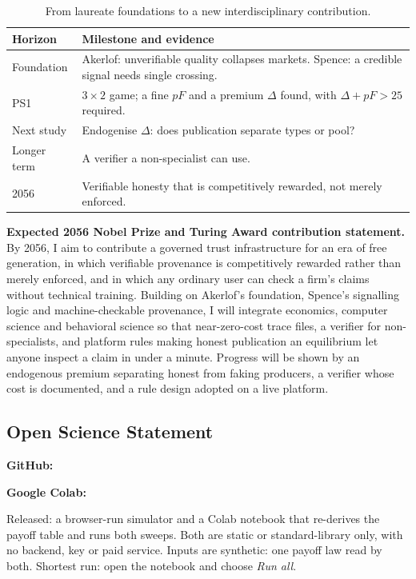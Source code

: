 \begin{table}[h]\caption{From laureate foundations to a new interdisciplinary contribution.}
\begin{tabularx}{\columnwidth}{@{}p{1.4cm}Y@{}}\toprule
\textbf{Horizon}&\textbf{Milestone and evidence}\\\midrule
Foundation&Akerlof: unverifiable quality collapses markets. Spence: a credible signal needs single crossing.\\
PS1&$3\times2$ game; a fine $pF$ and a premium $\Delta$ found, with $\Delta+pF>25$ required.\\
Next study&Endogenise $\Delta$: does publication separate types or pool?\\
Longer term&A verifier a non-specialist can use.\\
2056&Verifiable honesty that is competitively rewarded, not merely enforced.\\\bottomrule
\end{tabularx}\end{table}

\noindent\textbf{Expected 2056 Nobel Prize and Turing Award contribution statement.}
By 2056, I aim to contribute a governed trust infrastructure for an era of free generation, in which verifiable provenance is competitively rewarded rather than merely enforced, and in which any ordinary user can check a firm's claims without technical training. Building on Akerlof's foundation, Spence's signalling logic and machine-checkable provenance, I will integrate economics, computer science and behavioral science so that near-zero-cost trace files, a verifier for non-specialists, and platform rules making honest publication an equilibrium let anyone inspect a claim in under a minute. Progress will be shown by an endogenous premium separating honest from faking producers, a verifier whose cost is documented, and a rule design adopted on a live platform.

\subsection*{Open Science Statement}
\noindent\textbf{GitHub:} \GitHubLink\par
\noindent\textbf{Google Colab:} \ColabLink\par\medskip
\noindent Released: a browser-run simulator and a Colab notebook that re-derives the payoff table and runs both sweeps. Both are static or standard-library only, with no backend, key or paid service. Inputs are synthetic: one payoff law read by both. Shortest run: open the notebook and choose \emph{Run all}.

